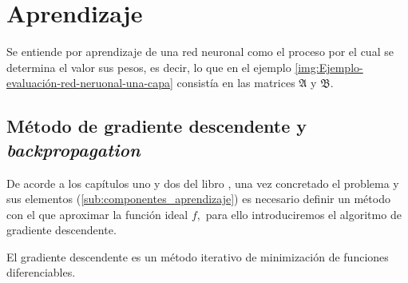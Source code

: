 \section{Aprendizaje}  

Se entiende por aprendizaje de una red neuronal como el proceso 
por el cual se determina el valor sus pesos, es decir, lo que en el ejemplo \ref{img:Ejemplo-evaluación-red-neruonal-una-capa} consistía en las matrices $\mathfrak A$ y $\mathfrak B$. 


\subsection{Método de gradiente descendente y \textit{backpropagation}} \label{sec:gradiente-descendente}

De acorde a los capítulos uno y dos del libro  \cite{learning-from-data-1-2},
 una vez concretado el problema y sus elementos 
(\ref{sub:componentes_aprendizaje}) es necesario definir un método con 
el que aproximar la función ideal $f,$ para ello introduciremos el algoritmo de gradiente descendente.  

El gradiente descendente es un método iterativo de minimización de funciones diferenciables. 

\reversemarginpar
{} 

\normalmarginpar
\setlength{\marginparwidth}{\smallMarginSize}


